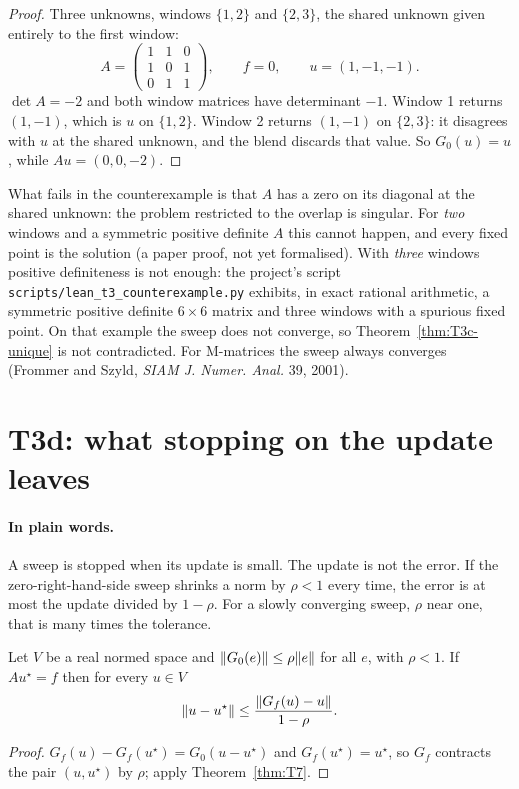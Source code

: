 \begin{proof}
  \leanok
  Three unknowns, windows $\{1,2\}$ and $\{2,3\}$, the shared unknown given
  entirely to the first window:
  \[
    A=\begin{pmatrix}1&1&0\\1&0&1\\0&1&1\end{pmatrix},\qquad f=0,\qquad
    u=(1,-1,-1).
  \]
  $\det A=-2$ and both window matrices have determinant $-1$.  Window 1 returns
  $(1,-1)$, which is $u$ on $\{1,2\}$.  Window 2 returns $(1,-1)$ on $\{2,3\}$:
  it disagrees with $u$ at the shared unknown, and the blend discards that
  value.  So $G_0(u)=u$, while $Au=(0,0,-2)$.
\end{proof}

\begin{remark}
  What fails in the counterexample is that $A$ has a zero on its diagonal at
  the shared unknown: the problem restricted to the overlap is singular.  For
  \emph{two} windows and a symmetric positive definite $A$ this cannot happen,
  and every fixed point is the solution (a paper proof, not yet formalised).
  With \emph{three} windows positive definiteness is not enough: the project's
  script \texttt{scripts/lean\_t3\_counterexample.py} exhibits, in exact
  rational arithmetic, a symmetric positive definite $6\times6$ matrix and three
  windows with a spurious fixed point.  On that example the sweep does not
  converge, so Theorem~\ref{thm:T3c-unique} is not contradicted.  For
  M-matrices the sweep always converges (Frommer and Szyld, \emph{SIAM J.
  Numer. Anal.} 39, 2001).
\end{remark}

\section{T3d: what stopping on the update leaves}

\paragraph{In plain words.}
A sweep is stopped when its update is small.  The update is not the error.  If
the zero-right-hand-side sweep shrinks a norm by $\rho<1$ every time, the error
is at most the update divided by $1-\rho$.  For a slowly converging sweep,
$\rho$ near one, that is many times the tolerance.

\begin{theorem}\label{thm:T3d}
  \leanok
  Let $V$ be a real normed space and $\lVert G_0(e)\rVert\le\rho\lVert e\rVert$ for all
  $e$, with $\rho<1$.  If $Au^\star=f$ then for every $u\in V$
  \[
    \lVert u-u^\star\rVert\le\frac{\lVert G_f(u)-u\rVert}{1-\rho}.
  \]
\end{theorem}

\begin{proof}
  \leanok
  $G_f(u)-G_f(u^\star)=G_0(u-u^\star)$ and $G_f(u^\star)=u^\star$, so $G_f$
  contracts the pair $(u,u^\star)$ by $\rho$; apply Theorem~\ref{thm:T7}.
\end{proof}
